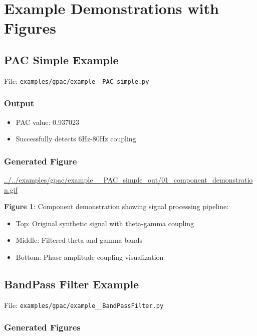 \documentclass[11pt,a4paper]{article}
\begin{document}
\section{Example Demonstrations with Figures}
\label{sec:org211fea5}

\subsection{PAC Simple Example}
\label{sec:orgc379062}

File: \texttt{examples/gpac/example\_\_PAC\_simple.py}

\subsubsection{Output}
\label{sec:orgdf94fea}
\begin{itemize}
\item PAC value: 0.937023
\item Successfully detects 6Hz-80Hz coupling
\end{itemize}

\subsubsection{Generated Figure}
\label{sec:org0f8d525}
\url{../../examples/gpac/example\_\_PAC\_simple\_out/01\_component\_demonstration.gif}

\textbf{Figure 1}: Component demonstration showing signal processing pipeline:
\begin{itemize}
\item Top: Original synthetic signal with theta-gamma coupling
\item Middle: Filtered theta and gamma bands
\item Bottom: Phase-amplitude coupling visualization
\end{itemize}

\subsection{BandPass Filter Example}
\label{sec:org3c2a1a5}

File: \texttt{examples/gpac/example\_\_BandPassFilter.py}

\subsubsection{Generated Figures}
\label{sec:org0bffa06}
\end{document}
